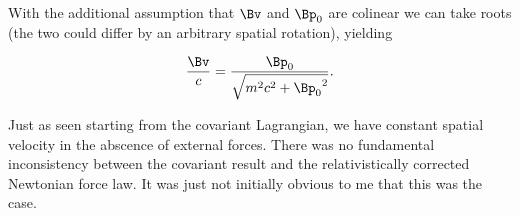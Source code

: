 With the additional assumption that $\Bv$ and $\Bp_0$ are colinear we can take roots (the two could differ by an arbitrary spatial rotation), yielding

\begin{align}\label{eqn:constFourMomentum:qqq14}
\frac{\Bv}{c} = \frac{ \Bp_0} { \sqrt{m^2 c^2 + {\Bp_0}^2} }.
\end{align}

Just as seen starting from the covariant Lagrangian, we have constant spatial velocity in the abscence of external forces.  There was no fundamental inconsistency between the covariant result and the relativistically corrected Newtonian force law.  It was just not initially obvious to me that this was the case.

\EndNoBibArticle
